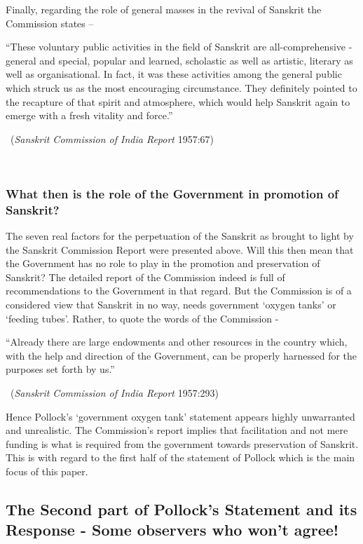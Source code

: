 Finally, regarding the role of general masses in the revival of Sanskrit the Commission states – 
\begin{myquote}
\eleven
“These voluntary public activities in the field of Sanskrit are all-comprehensive - general and special, popular and learned, scholastic as well as artistic, literary as well as organisational. In fact, it was these activities among the general public which struck us as the most encouraging circumstance. They definitely pointed to the recapture of that spirit and atmosphere, which would help Sanskrit again to emerge with a fresh vitality and force.”
\vskip -5pt

~\hfill ({\sl Sanskrit Commission of India Report} 1957:67)
\end{myquote}

~\\[-40pt]

\subsubsection{What then is the role of the Government in promotion of Sanskrit?}
\vskip -5pt

The seven real factors for the perpetuation of the Sanskrit as brought to light by the Sanskrit Commission Report were presented above. Will this then mean that the Government has no role to play in the promotion and preservation of Sanskrit?  The detailed report of the Commission indeed is full of recommendations to the Government in that regard. But the Commission is of a considered view that Sanskrit in no way, needs government ‘oxygen tanks’ or ‘feeding tubes’. Rather, to quote the words of the Commission -
\begin{myquote}
\eleven
“Already there are large endowments and other resources in the country which, with the help and direction of the Government, can be properly harnessed for the purposes set forth by us.” 
\vskip -5pt

~\hfill({\sl Sanskrit Commission of India Report} 1957:293)
\end{myquote}

Hence Pollock’s ‘government oxygen tank’ statement appears highly unwarranted and unrealistic. The Commission’s report implies that facilitation and not mere funding is what is required from the government towards preservation of Sanskrit. This is with regard to the first half of the statement of Pollock which is the main focus of this paper.   

\subsection{The Second part of Pollock’s Statement and its Response - Some observers who won’t agree!}

